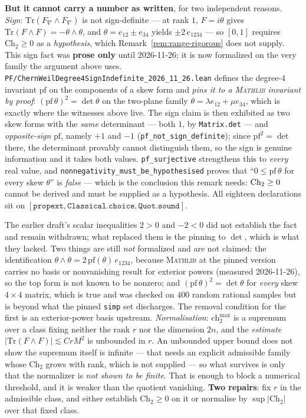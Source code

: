 \begin{remark}
\textbf{But it cannot carry a number as written}, for two independent reasons.
\emph{Sign}: $\mathrm{Tr}(F_\nabla \wedge F_\nabla)$ is not sign-definite --- at
rank $1$, $F = i\theta$ gives $\mathrm{Tr}(F\wedge F) = -\theta\wedge\theta$, and
$\theta = e_{12} \pm e_{34}$ yields $\pm 2\,e_{1234}$
--- so $[0,1]$ requires
$\mathrm{Ch}_2 \ge 0$ as a \emph{hypothesis}, which Remark~\ref{rem:range-rigorous}
does not supply. This sign fact was \textbf{prose only} until 2026-11-26; it is now
formalized on the very family the argument above uses.
\texttt{PF/ChernWeilDegree4SignIndefinite\_2026\_11\_26.lean} defines the
degree-4 invariant $\mathrm{pf}$ on the components of a skew form and
\emph{pins it to a \textsc{Mathlib} invariant by proof}:
$(\mathrm{pf}\,\theta)^2 = \det\theta$ on the two-plane family
$\theta = \lambda e_{12} + \mu e_{34}$, which is exactly where the witnesses
above live. The sign claim is then exhibited as two skew forms with the
\emph{same} determinant --- both $1$, by \texttt{Matrix.det} --- and
\emph{opposite-sign} $\mathrm{pf}$, namely $+1$ and $-1$
(\texttt{pf\_not\_sign\_definite}); since $\mathrm{pf}^2 = \det$ there, the
determinant provably cannot distinguish them, so the sign is genuine
information and it takes both values. \texttt{pf\_surjective} strengthens this
to \emph{every} real value, and \texttt{nonnegativity\_must\_be\_hypothesised}
proves that ``$0 \le \mathrm{pf}\,\theta$ for every skew $\theta$'' is
\emph{false} --- which is the conclusion this remark needs: $\mathrm{Ch}_2 \ge 0$
cannot be derived and must be supplied as a hypothesis. All eighteen
declarations sit on $[\mathtt{propext}, \mathtt{Classical.choice},
\mathtt{Quot.sound}]$.

The earlier draft's scalar inequalities $2 > 0$ and $-2 < 0$ did not establish
the fact and remain withdrawn; what replaced them is the pinning to $\det$,
which is what they lacked. Two things are still \emph{not} formalized and are
not claimed: the identification
$\theta \wedge \theta = 2\,\mathrm{pf}(\theta)\, e_{1234}$, because \textsc{Mathlib}
at the pinned version carries no basis or nonvanishing result for exterior
powers (measured 2026-11-26), so the top form is not known to be nonzero; and
$(\mathrm{pf}\,\theta)^2 = \det\theta$ for \emph{every} skew $4\times 4$ matrix,
which is true and was checked on $400$ random rational samples but is beyond
what the pinned \texttt{simp} set discharges. The removal condition for the
first is an exterior-power basis upstream.
\emph{Normalisation}: $\text{ch}_2^{\max}$ is a supremum over a class fixing
neither the rank $r$ nor the dimension $2n$, and the \emph{estimate}
$|\mathrm{Tr}(F\wedge F)| \lesssim C r M^2$ is unbounded in $r$. An unbounded
upper bound does not show the supremum itself is infinite --- that needs an
explicit admissible family whose $\mathrm{Ch}_2$ grows with rank, which is not
supplied --- so what survives is only that the normalizer is \emph{not shown to
be finite}. That is enough to block a numerical threshold, and it is weaker than
the quotient vanishing. \textbf{Two repairs}: fix $r$ in the admissible class,
and either establish $\mathrm{Ch}_2 \ge 0$ on it or normalise by
$\sup|\mathrm{Ch}_2|$ over that fixed class.


\end{remark}

